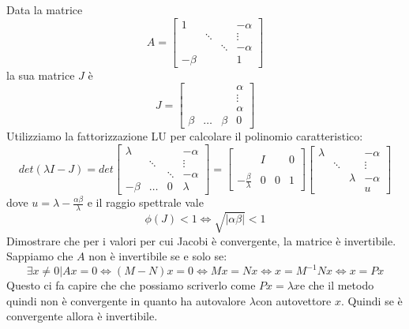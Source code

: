 \begin{example}
	Data la matrice
	\begin{equation*}
		A=\begin{bmatrix}
			1 & & &-\alpha \\
			& \ddots && \vdots\\
			& & \ddots & -\alpha\\
			-\beta & & & 1
		\end{bmatrix}
	\end{equation*}
	la sua matrice $J$ è
	\begin{equation*}
		J = \begin{bmatrix}
			 & & &\alpha \\
			&  && \vdots\\
			& &  & \alpha\\
			\beta & \ldots& \beta& 0
		\end{bmatrix}
	\end{equation*}
	Utilizziamo la fattorizzazione LU per calcolare il polinomio caratteristico:
	\begin{equation*}
		det(\lambda I - J) = det \begin{bmatrix}
			\lambda & & &-\alpha \\
			&  \ddots&& \vdots\\
			& &  \ddots& -\alpha\\
			-\beta & \ldots& 0& \lambda
		\end{bmatrix} = \begin{bmatrix}
		& & & \\
		&  I&& 0\\
		& &  & \\
		-\frac{\beta}{\lambda}&0 &0  & 1
		\end{bmatrix} \begin{bmatrix}
		\lambda& & & -\alpha\\
		&  \ddots&& \vdots\\
		& &  \lambda& -\alpha\\
		&&  & u
		\end{bmatrix}
	\end{equation*}
	dove $u = \lambda - \frac{\alpha\beta}{\lambda}$ e il raggio spettrale vale
	\begin{equation*}
		\phi(J)< 1 \Leftrightarrow \sqrt{\lvert \alpha \beta \rvert} < 1
	\end{equation*}
	Dimostrare che per i valori per cui Jacobi è convergente, la matrice è invertibile.\\
	Sappiamo che $A$ non è invertibile se e solo se:
	\begin{equation*}
		\exists x \neq 0 \vert Ax=0 \Leftrightarrow (M-N)x=0 \Leftrightarrow Mx=Nx \Leftrightarrow x=M^{-1}Nx \Leftrightarrow x=Px
	\end{equation*}
	Questo ci fa capire che che possiamo scriverlo come $Px=\lambda x$e che il metodo quindi non è convergente in quanto ha autovalore $\lambda$con autovettore $x$. Quindi se è convergente allora è invertibile.
\end{example}

